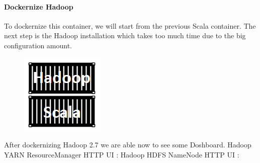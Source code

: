 \paragraph{Dockernize Hadoop}
\label{sec:sec01}
To dockernize this container, we will start from the previous Scala container. 
The next step is the Hadoop installation which takes too much time due to the big configuration amount.
\begin{figure}[h!]
	\centering
	\includegraphics[height=0.2\textheight]{fig01/HadoopContainer}
	\label{fig:FilialesEtClients}
\end{figure}
After dockernizing Hadoop 2.7 we are able now to see some Doshboard.
Hadoop YARN ResourceManager HTTP UI :
Hadoop HDFS NameNode HTTP UI :
